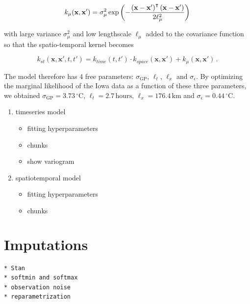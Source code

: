 \documentclass[letter]{article}
\providecommand{\tightlist}{%
      \setlength{\itemsep}{0pt}\setlength{\parskip}{0pt}}
\newcommand{\genericdel}[3]{%
      \left#1#3\right#2
    }
\newcommand{\del}[1]{\genericdel(){#1}}
\newcommand{\xvec}{\mathbf{x}}
\newcommand{\trans}{^{\intercal}}
\newcommand{\sigmaf}{\sigma_{\mathrm{GP}}}
\newcommand{\sigman}{\sigma_{\epsilon}}
\newcommand{\degreeC}{^\circ \mathrm{C}}
\providecommand{\tightlist}{%
  	  \setlength{\itemsep}{0pt}\setlength{\parskip}{0pt}}
\begin{document}
\begin{equation}
    k_{\mu}(\xvec, \xvec') = \sigma_\mu^2 \exp\del{-\frac{\del{\xvec-\xvec'}\trans\del{\xvec-\xvec'}}{2\ell_\mu^2}}
\end{equation}

with large variance \(\sigma_\mu^2\) and low lengthscale \(\ell_\mu\)
added to the covariance function so that the spatio-temporal kernel
becomes

\begin{equation}
    k_{st}(\xvec,\xvec',t,t') = k_{time}(t,t') \cdot k_{space}(\xvec, \xvec') + k_\mu(\xvec, \xvec') \,.
\end{equation}

The model therefore has 4 free parameters: \(\sigmaf\), \(\ell_t\),
\(\ell_x\) and \(\sigman\). By optimizing the marginal likelihood of the
Iowa data as a function of these three parameters, we obtained
\(\sigmaf=3.73\,\degreeC\), \(\ell_t=2.7\,\mathrm{hours}\),
\(\ell_x=176.4\,\mathrm{km}\) and \(\sigman=0.44\,\degreeC\).
    


    	\begin{enumerate}
\def\labelenumi{\arabic{enumi}.}
\tightlist
\item
  timeseries model

  \begin{itemize}
  \tightlist
  \item
    fitting hyperparameters
  \item
    chunks
  \item
    show variogram
  \end{itemize}
\item
  spatiotemporal model

  \begin{itemize}
  \tightlist
  \item
    fitting hyperparameters
  \item
    chunks
  \end{itemize}
\end{enumerate}
    


    	\section{Imputations}\label{imputations}

\begin{verbatim}
* Stan
* softmin and softmax
* observation noise
* reparametrization
\end{verbatim}
\end{document}
